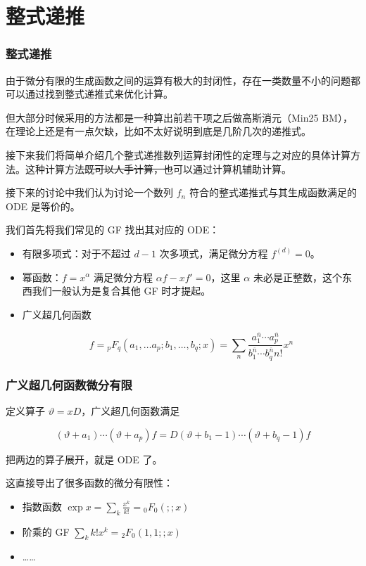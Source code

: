 \documentclass[mathserif]{ctexbeamer}
\begin{document}
\section{整式递推}
\frame{\sectionpage}

\frame
{
  \frametitle{整式递推}
  
  由于微分有限的生成函数之间的运算有极大的封闭性，存在一类数量不小的问题都可以通过找到整式递推式来优化计算。
  
  但大部分时候采用的方法都是一种算出前若干项之后做高斯消元（Min25 BM），在理论上还是有一点欠缺，比如不太好说明到底是几阶几次的递推式。
}

\frame
{
  接下来我们将简单介绍几个整式递推数列运算封闭性的定理与之对应的具体计算方法。这种计算方法\sout{既可以人手计算，也}可以通过计算机辅助计算。
  
  接下来的讨论中我们认为讨论一个数列 $f_n$ 符合的整式递推式与其生成函数满足的 ODE 是等价的。
}

\frame
{
  我们首先将我们常见的 GF 找出其对应的 ODE：
  
  \begin{itemize}
  \item<1-> 有限多项式：对于不超过 $d-1$ 次多项式，满足微分方程 $f^{(d)}=0$。
  
  \item<2-> 幂函数：$f=x^\alpha$ 满足微分方程 $\alpha f-xf'=0$，这里 $\alpha$ 未必是正整数，这个东西我们一般认为是复合其他 GF 时才提起。
  
  \item<3-> 广义超几何函数
  
  $$
  f = {}_p F_q(a_1,\dots a_p; b_1, \dots, b_q;x) = \sum_n \frac{a_1^{\overline n} \cdots a_p^{\overline n}}{b_1^{\overline n} \cdots b_q^{\overline n}n!}x^n
  $$
  \end{itemize}
}

\frame
{
  \frametitle{广义超几何函数微分有限}
  
  定义算子 $\vartheta = xD$，广义超几何函数满足
  
  $$
  (\vartheta + a_1) \cdots (\vartheta + a_p)f = D (\vartheta + b_1 - 1) \cdots  (\vartheta + b_q - 1)f
  $$
  
  把两边的算子展开，就是 ODE 了。
  
  这直接导出了很多函数的微分有限性：
  
  \begin{itemize}
  \item 指数函数 $\exp x = \sum_k \frac{x^k}{k!} = {}_0F_0(;;x)$
  
  \item 阶乘的 GF $\sum_k k! x^k = {}_2F_0(1,1;;x)$
  
  \item ……
  \end{itemize}
}
\end{document}
